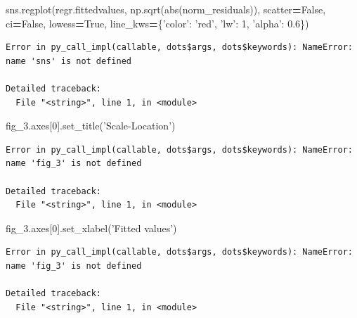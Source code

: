 \documentclass[]{book}
\newenvironment{Shaded}{\begin{snugshade}}{\end{snugshade}}
\newcommand{\BuiltInTok}[1]{#1}
\newcommand{\DecValTok}[1]{\textcolor[rgb]{0.00,0.00,0.81}{#1}}
\newcommand{\FloatTok}[1]{\textcolor[rgb]{0.00,0.00,0.81}{#1}}
\newcommand{\NormalTok}[1]{#1}
\newcommand{\OperatorTok}[1]{\textcolor[rgb]{0.81,0.36,0.00}{\textbf{#1}}}
\newcommand{\StringTok}[1]{\textcolor[rgb]{0.31,0.60,0.02}{#1}}
\newcommand{\VariableTok}[1]{\textcolor[rgb]{0.00,0.00,0.00}{#1}}
\begin{document}
\begin{Shaded}
\begin{Highlighting}[]
\NormalTok{sns.regplot(regr.fittedvalues, np.sqrt(}\BuiltInTok{abs}\NormalTok{(norm_residuals)), }
\NormalTok{            scatter}\OperatorTok{=}\VariableTok{False}\NormalTok{, }
\NormalTok{            ci}\OperatorTok{=}\VariableTok{False}\NormalTok{, }
\NormalTok{            lowess}\OperatorTok{=}\VariableTok{True}\NormalTok{,}
\NormalTok{            line_kws}\OperatorTok{=}\NormalTok{\{}\StringTok{'color'}\NormalTok{: }\StringTok{'red'}\NormalTok{, }\StringTok{'lw'}\NormalTok{: }\DecValTok{1}\NormalTok{, }\StringTok{'alpha'}\NormalTok{: }\FloatTok{0.6}\NormalTok{\})}
\end{Highlighting}
\end{Shaded}

\begin{verbatim}
Error in py_call_impl(callable, dots$args, dots$keywords): NameError: name 'sns' is not defined

Detailed traceback: 
  File "<string>", line 1, in <module>
\end{verbatim}

\begin{Shaded}
\begin{Highlighting}[]
\NormalTok{fig_3.axes[}\DecValTok{0}\NormalTok{].set_title(}\StringTok{'Scale-Location'}\NormalTok{)}
\end{Highlighting}
\end{Shaded}

\begin{verbatim}
Error in py_call_impl(callable, dots$args, dots$keywords): NameError: name 'fig_3' is not defined

Detailed traceback: 
  File "<string>", line 1, in <module>
\end{verbatim}

\begin{Shaded}
\begin{Highlighting}[]
\NormalTok{fig_3.axes[}\DecValTok{0}\NormalTok{].set_xlabel(}\StringTok{'Fitted values'}\NormalTok{)}
\end{Highlighting}
\end{Shaded}

\begin{verbatim}
Error in py_call_impl(callable, dots$args, dots$keywords): NameError: name 'fig_3' is not defined

Detailed traceback: 
  File "<string>", line 1, in <module>
\end{verbatim}
\end{document}
